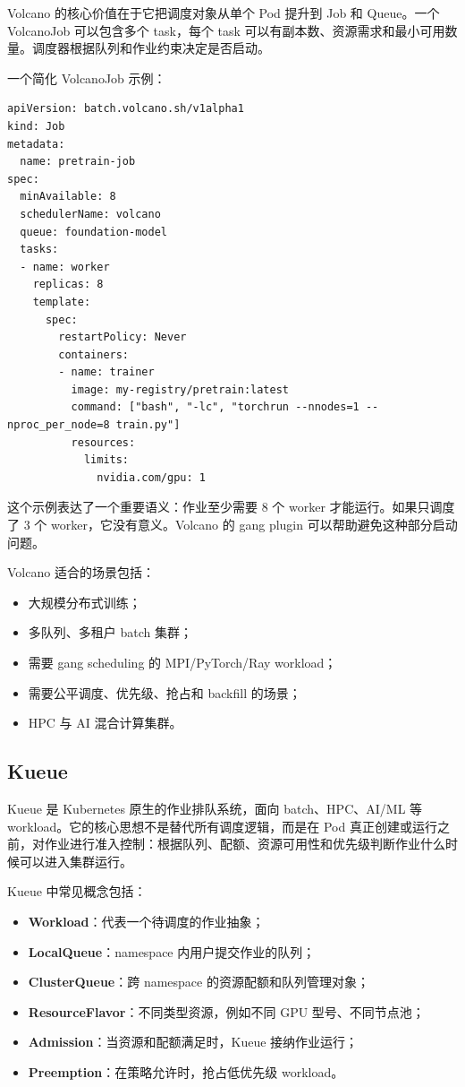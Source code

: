 Volcano 的核心价值在于它把调度对象从单个 Pod 提升到 Job 和 Queue。一个 VolcanoJob 可以包含多个 task，每个 task 可以有副本数、资源需求和最小可用数量。调度器根据队列和作业约束决定是否启动。

一个简化 VolcanoJob 示例：

\begin{lstlisting}[caption={VolcanoJob 的概念示例},label={lst:volcano-job-example}]
apiVersion: batch.volcano.sh/v1alpha1
kind: Job
metadata:
  name: pretrain-job
spec:
  minAvailable: 8
  schedulerName: volcano
  queue: foundation-model
  tasks:
  - name: worker
    replicas: 8
    template:
      spec:
        restartPolicy: Never
        containers:
        - name: trainer
          image: my-registry/pretrain:latest
          command: ["bash", "-lc", "torchrun --nnodes=1 --nproc_per_node=8 train.py"]
          resources:
            limits:
              nvidia.com/gpu: 1
\end{lstlisting}

这个示例表达了一个重要语义：作业至少需要 8 个 worker 才能运行。如果只调度了 3 个 worker，它没有意义。Volcano 的 gang plugin 可以帮助避免这种部分启动问题。

Volcano 适合的场景包括：

\begin{itemize}
  \item 大规模分布式训练；
  \item 多队列、多租户 batch 集群；
  \item 需要 gang scheduling 的 MPI/PyTorch/Ray workload；
  \item 需要公平调度、优先级、抢占和 backfill 的场景；
  \item HPC 与 AI 混合计算集群。
\end{itemize}

\subsection{Kueue}
\label{subsec:kueue}

Kueue 是 Kubernetes 原生的作业排队系统，面向 batch、HPC、AI/ML 等 workload。它的核心思想不是替代所有调度逻辑，而是在 Pod 真正创建或运行之前，对作业进行准入控制：根据队列、配额、资源可用性和优先级判断作业什么时候可以进入集群运行。

Kueue 中常见概念包括：

\begin{itemize}
  \item \textbf{Workload}：代表一个待调度的作业抽象；
  \item \textbf{LocalQueue}：namespace 内用户提交作业的队列；
  \item \textbf{ClusterQueue}：跨 namespace 的资源配额和队列管理对象；
  \item \textbf{ResourceFlavor}：不同类型资源，例如不同 GPU 型号、不同节点池；
  \item \textbf{Admission}：当资源和配额满足时，Kueue 接纳作业运行；
  \item \textbf{Preemption}：在策略允许时，抢占低优先级 workload。
\end{itemize}

